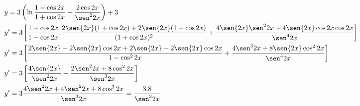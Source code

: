 \begin{ex}
\begin{align}
&y=3\left(\ln{\frac{1-\cos{2x}}{1+\cos{2x}}-\frac{2\cos{2x}}{\sen^2{2x}}}\right)+3\nonumber\\
&y'=3\left[\frac{1+\cos{2x}}{1-\cos{2x}}.\frac{2\sen{2x}(1+\cos{2x})+2\sen{2x}(1-\cos{2x})}{(1+\cos{2x})^2}+\frac{4\sen{2x}\sen^2{2x}+4\sen{2x}\cos{2x}\cos{2x}}{\sen^4{2x}}\right]\nonumber\\
&y'=3\left[\frac{2\sen{2x}+2\sen{2x}\cos{2x}+2\sen{2x}-2\sen{2x}\cos{2x}}{1-\cos^2{2x}}+\frac{4\sen^3{2x}+8\sen{2x}\cos^2{2x}}{\sen^4{2x}}\right]\nonumber\\
&y'=3\left[\frac{4\sen{2x}}{\sen^2{2x}}+\frac{2\sen^2{2x}+8\cos^2{2x}}{\sen^3{2x}}\right]\nonumber\\
&y'=3\frac{4\sen^2{2x}+4\sen^2{2x}+8\cos^2{2x}}{\sen^3{2x}}=\frac{3.8}{\sen^3{2x}}\nonumber
\end{align}
\end{ex}
